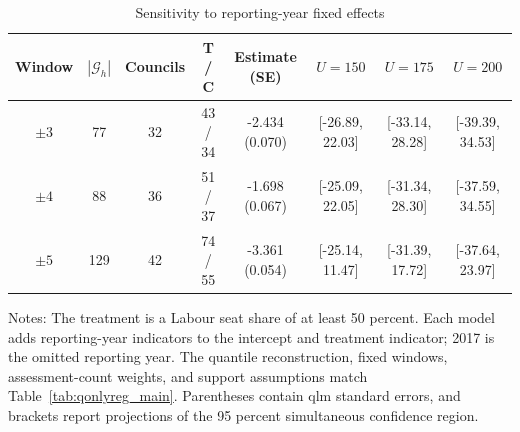 \begin{table}[!h]
\centering
\begin{threeparttable}
\caption{Sensitivity to reporting-year fixed effects}
\label{tab:qonlyreg_year_fixed_effects}
\small
\begin{tabular}{cccccccc}
\toprule
Window & $|\mathcal G_h|$ & Councils & T / C & Estimate (SE) & $U=150$ & $U=175$ & $U=200$ \\
\midrule
$\pm 3$ & 77 & 32 & 43 / 34 & -2.434 (0.070) & [-26.89, 22.03] & [-33.14, 28.28] & [-39.39, 34.53] \\
$\pm 4$ & 88 & 36 & 51 / 37 & -1.698 (0.067) & [-25.09, 22.05] & [-31.34, 28.30] & [-37.59, 34.55] \\
$\pm 5$ & 129 & 42 & 74 / 55 & -3.361 (0.054) & [-25.14, 11.47] & [-31.39, 17.72] & [-37.64, 23.97] \\
\bottomrule
\end{tabular}
\begin{tablenotes}[flushleft]
\footnotesize
\item Notes: The treatment is a Labour seat share of at least 50 percent. Each model adds reporting-year indicators to the intercept and treatment indicator; 2017 is the omitted reporting year. The quantile reconstruction, fixed windows, assessment-count weights, and support assumptions match Table~\ref{tab:qonlyreg_main}. Parentheses contain qlm standard errors, and brackets report projections of the 95 percent simultaneous confidence region.
\end{tablenotes}
\end{threeparttable}
\end{table}

